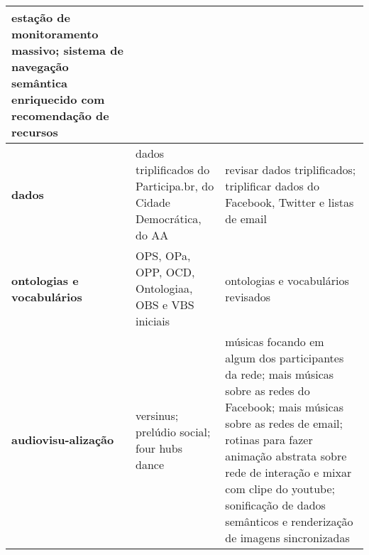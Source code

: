 \documentclass[a4paper,openright,12pt]{report} %
\begin{document}
\begin{table}[h]
\begin{tabular}{p{1.3cm}||p{7.6cm}|p{7.1cm}}
                       estação de monitoramento massivo;
                       sistema de navegação semântica enriquecido com recomendação de recursos
                       \\\hline
                       {\bf dados}        & dados triplificados do Participa.br, do Cidade Democrática, do AA  & revisar dados triplificados;
                       triplificar dados do Facebook, Twitter e listas de email \\\hline
                       {\bf ontologias e vocabulários}  & OPS, OPa, OPP, OCD, Ontologiaa, OBS e VBS iniciais  & ontologias e vocabulários revisados \\\hline
                       {\bf audiovisu-alização}         & versinus; prelúdio social; four hubs dance   & músicas focando em algum dos participantes da rede; mais músicas sobre as redes do Facebook; mais músicas sobre as redes de email; rotinas para fazer animação abstrata sobre rede de interação e mixar com clipe do youtube;
                       sonificação de dados semânticos e renderização de imagens sincronizadas \\\hline
\end{tabular}
\end{table}
\end{document}
